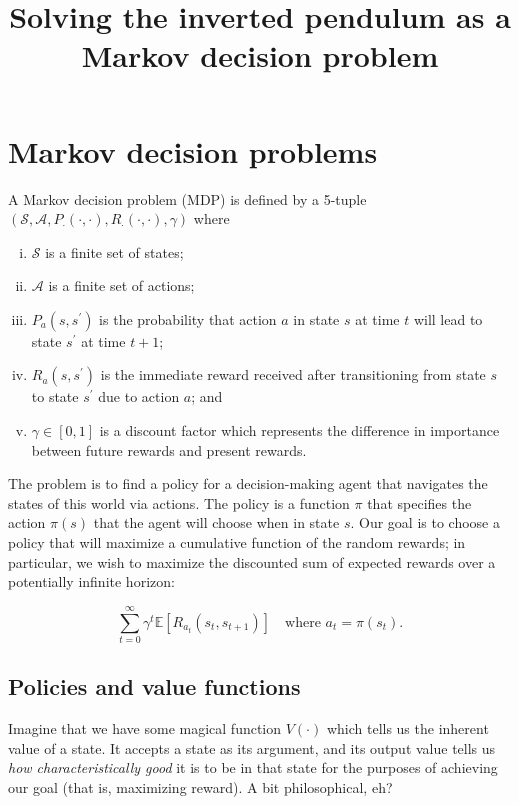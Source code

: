 \documentclass[12pt]{article}
\title{Solving the inverted pendulum as a Markov decision problem}
\date{}
\begin{document}
\maketitle

\section{Markov decision problems}

A Markov decision problem (MDP) is defined by a 5-tuple $(\mathscr{S}, \mathscr{A}, P_\cdot(\cdot, \cdot), R_\cdot(\cdot, \cdot), \gamma)$ where

\begin{enumerate}[(i)]
\item $\mathscr{S}$ is a finite set of states;
\item $\mathscr{A}$ is a finite set of actions;
\item $P_a(s, s^\prime)$ is the probability that action $a$ in state $s$ at time $t$ will lead to state $s^\prime$ at time $t + 1$;
\item $R_a(s, s^\prime)$ is the immediate reward received after transitioning from state $s$ to state $s^\prime$ due to action $a$; and
\item $\gamma \in [0, 1]$ is a discount factor which represents the difference in importance between future rewards and present rewards.
\end{enumerate}

The problem is to find a policy for a decision-making agent that navigates the states of this world via actions. The policy is a function $\pi$ that specifies the action $\pi(s)$ that the agent will choose when in state $s$. Our goal is to choose a policy that will maximize a cumulative function of the random rewards; in particular, we wish to maximize the discounted sum of expected rewards over a potentially infinite horizon:

\begin{equation}
\sum_{t = 0}^{\infty} \gamma^t \mathbb{E}[R_{a_t}(s_t, s_{t+1})] \quad \mbox{where } a_t = \pi(s_t).
\end{equation}

\subsection{Policies and value functions}

Imagine that we have some magical function $V(\cdot)$ which tells us the inherent value of a state. It accepts a state as its argument, and its output value tells us \emph{how characteristically good} it is to be in that state for the purposes of achieving our goal (that is, maximizing reward). A bit philosophical, eh?
\end{document}
